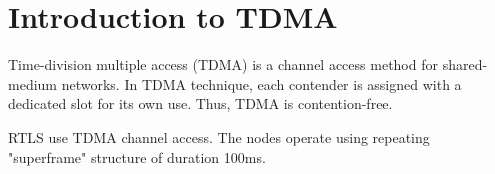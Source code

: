 \documentclass[../main.tex]{subfiles}
\begin{document}
\chapter{Introduction to TDMA}

Time-division multiple access (TDMA) is a channel access method for shared-medium networks. In TDMA technique, each contender is assigned with a dedicated slot for its own use. Thus, TDMA is contention-free. 

RTLS use TDMA channel access. The nodes operate using repeating "superframe" structure of duration 100ms.
\end{document}
